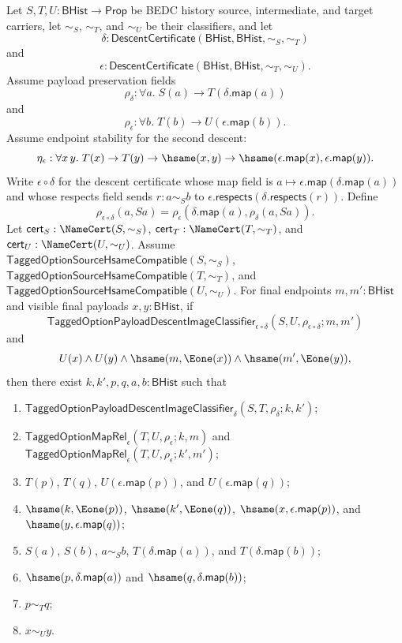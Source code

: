 \begin{theorem}
Let $S,T,U:\mathsf{BHist}\to\mathsf{Prop}$ be BEDC history source, intermediate,
and target carriers, let $\sim_S$, $\sim_T$, and $\sim_U$ be their classifiers,
and let
$$
\delta:\mathsf{DescentCertificate}(\mathsf{BHist},\mathsf{BHist},\sim_S,\sim_T)
$$
and
$$
\epsilon:\mathsf{DescentCertificate}(\mathsf{BHist},\mathsf{BHist},\sim_T,\sim_U).
$$
Assume payload preservation fields
$$
\rho_{\delta}:\forall a.\;S(a)\to T(\delta.\mathsf{map}(a))
$$
and
$$
\rho_{\epsilon}:\forall b.\;T(b)\to U(\epsilon.\mathsf{map}(b)).
$$
Assume endpoint stability for the second descent:
$$
\eta_{\epsilon}:\forall x\,y.\;
T(x)\to T(y)\to \hsame(x,y)\to
\hsame(\epsilon.\mathsf{map}(x),\epsilon.\mathsf{map}(y)).
$$
Write $\epsilon\circ\delta$ for the descent certificate whose map field is
$a\mapsto\epsilon.\mathsf{map}(\delta.\mathsf{map}(a))$ and whose respects field
sends $r:a\sim_S b$ to
$\epsilon.\mathsf{respects}(\delta.\mathsf{respects}(r))$. Define
$$
\rho_{\epsilon\circ\delta}(a,Sa)=
\rho_{\epsilon}(\delta.\mathsf{map}(a),\rho_{\delta}(a,Sa)).
$$
Let $\mathsf{cert}_S:\NameCert(S,\sim_S)$,
$\mathsf{cert}_T:\NameCert(T,\sim_T)$, and
$\mathsf{cert}_U:\NameCert(U,\sim_U)$. Assume
$\mathsf{TaggedOptionSourceHsameCompatible}(S,\sim_S)$,
$\mathsf{TaggedOptionSourceHsameCompatible}(T,\sim_T)$, and
$\mathsf{TaggedOptionSourceHsameCompatible}(U,\sim_U)$. For final endpoints
$m,m':\mathsf{BHist}$ and visible final payloads $x,y:\mathsf{BHist}$, if
$$
\mathsf{TaggedOptionPayloadDescentImageClassifier}_{\epsilon\circ\delta}
(S,U,\rho_{\epsilon\circ\delta};m,m')
$$
and
$$
U(x)\land U(y)\land
\hsame(m,\Eone(x))\land
\hsame(m',\Eone(y)),
$$
then there exist $k,k',p,q,a,b:\mathsf{BHist}$ such that
\begin{enumerate}
\item $\mathsf{TaggedOptionPayloadDescentImageClassifier}_{\delta}
(S,T,\rho_{\delta};k,k')$;
\item $\mathsf{TaggedOptionMapRel}_{\epsilon}(T,U,\rho_{\epsilon};k,m)$ and
$\mathsf{TaggedOptionMapRel}_{\epsilon}(T,U,\rho_{\epsilon};k',m')$;
\item $T(p)$, $T(q)$, $U(\epsilon.\mathsf{map}(p))$, and
$U(\epsilon.\mathsf{map}(q))$;
\item $\hsame(k,\Eone(p))$, $\hsame(k',\Eone(q))$,
$\hsame(x,\epsilon.\mathsf{map}(p))$, and
$\hsame(y,\epsilon.\mathsf{map}(q))$;
\item $S(a)$, $S(b)$, $a\sim_S b$,
$T(\delta.\mathsf{map}(a))$, and $T(\delta.\mathsf{map}(b))$;
\item $\hsame(p,\delta.\mathsf{map}(a))$ and
$\hsame(q,\delta.\mathsf{map}(b))$;
\item $p\sim_T q$;
\item $x\sim_U y$.
\end{enumerate}
\end{theorem}
